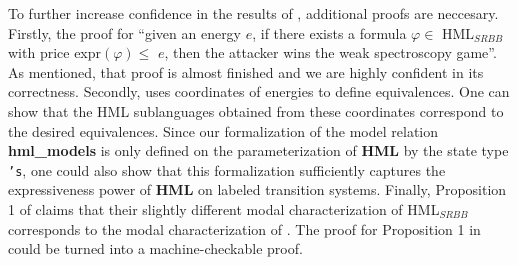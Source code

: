 To further increase confidence in the results of \cite{bisping2023lineartimebranchingtime}, additional proofs are neccesary. Firstly, the proof for ``given an energy $e$, if there exists a formula $\varphi \in$ HML$_{SRBB}$ with price expr$(\varphi) \leq$ $e$, then the attacker wins the weak spectroscopy game''.
As mentioned, that proof is almost finished and we are highly confident in its correctness. 
Secondly, \cite{bisping2023lineartimebranchingtime} uses coordinates of energies to define equivalences. One can show that the HML sublanguages obtained from these coordinates correspond to the desired equivalences.
Since our formalization of the model relation \textbf{hml\_models} is only defined on the parameterization of \textbf{HML} by the state type \texttt{'s}, one could also show that this formalization sufficiently captures the expressiveness power of \textbf{HML} on labeled transition systems.
Finally, Proposition 1 of \cite{bisping2023lineartimebranchingtime} claims that their slightly different modal characterization of HML$_{SRBB}$ corresponds to the modal characterization of \cite{FOKKINK2019104435}. 
The proof for Proposition 1 in \cite{bisping2023lineartimebranchingtime} could be turned into a machine-checkable proof. 